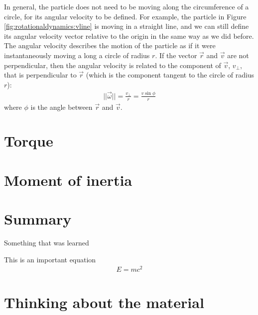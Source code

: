In general, the particle does not need to be moving along the circumference of a circle, for its angular velocity to be defined. For example, the particle in Figure \ref{fig:rotationaldynamics:vline} is moving in a straight line, and we can still define its angular velocity vector relative to the origin in the same way as we did before. 
The angular velocity describes the motion of the particle as if it were instantaneously moving a long a circle of radius $r$. If the vector $\vec r$ and $\vec v$ are not perpendicular, then the angular velocity is related to the component of $\vec v$, $v_\perp$, that is perpendicular to $\vec r$ (which is the component tangent to the circle of radius $r$):
\begin{align*}
||\vec \omega|| = \frac{v_\perp}{r}=\frac{v\sin\phi}{r}
\end{align*}
where $\phi$ is the angle between $\vec r$ and $\vec v$.



\section{Torque}

\section{Moment of inertia}


\newpage
\section{Summary}

\begin{chapterSummary}{
\item Something that was learned
}
\end{chapterSummary}

\newpage
\begin{importantEquations}
This is an important equation
\begin{align*}
E = mc^2
\end{align*}

\end{importantEquations}


\newpage
\section{Thinking about the material}

